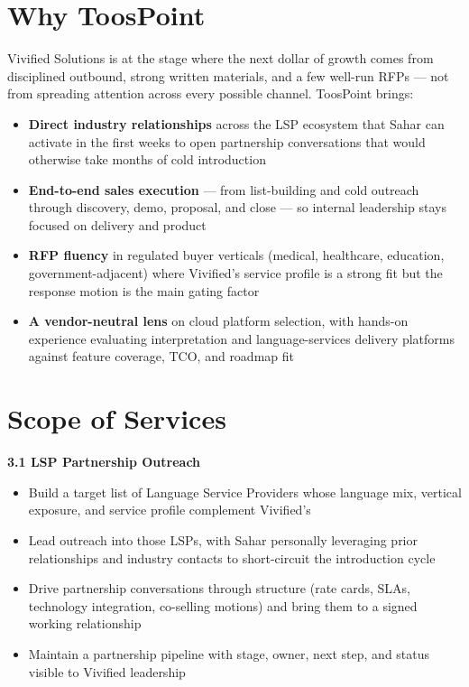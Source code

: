 \documentclass{toospoint}
\begin{document}
\section{Why ToosPoint}

Vivified Solutions is at the stage where the next dollar of growth comes from
disciplined outbound, strong written materials, and a few well-run RFPs --- not
from spreading attention across every possible channel. ToosPoint brings:

\begin{itemize}[leftmargin=1.5em, itemsep=3pt, topsep=2pt]
  \item \textbf{Direct industry relationships} across the LSP ecosystem that
        Sahar can activate in the first weeks to open partnership conversations
        that would otherwise take months of cold introduction
  \item \textbf{End-to-end sales execution} --- from list-building and cold
        outreach through discovery, demo, proposal, and close --- so internal
        leadership stays focused on delivery and product
  \item \textbf{RFP fluency} in regulated buyer verticals (medical, healthcare,
        education, government-adjacent) where Vivified's service profile is a
        strong fit but the response motion is the main gating factor
  \item \textbf{A vendor-neutral lens} on cloud platform selection, with
        hands-on experience evaluating interpretation and language-services
        delivery platforms against feature coverage, TCO, and roadmap fit
\end{itemize}

\section{Scope of Services}

\noindent\textbf{\color{TPDark}3.1 \quad LSP Partnership Outreach}
\begin{itemize}[leftmargin=1.5em, itemsep=2pt, topsep=2pt]
  \item Build a target list of Language Service Providers whose language mix, vertical exposure, and service profile complement Vivified's
  \item Lead outreach into those LSPs, with Sahar personally leveraging prior relationships and industry contacts to short-circuit the introduction cycle
  \item Drive partnership conversations through structure (rate cards, SLAs, technology integration, co-selling motions) and bring them to a signed working relationship
  \item Maintain a partnership pipeline with stage, owner, next step, and status visible to Vivified leadership
\end{itemize}
\end{document}
